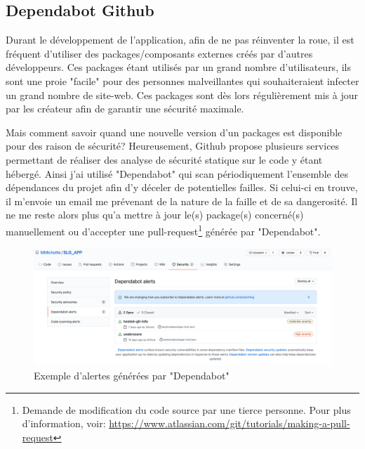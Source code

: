 \newpage 

\subsection{Dependabot Github}

Durant le développement de l'application, afin de ne pas réinventer la roue, il est fréquent d'utiliser des packages/composants externes créés par d'autres développeurs. Ces packages étant utilisés par un grand nombre d'utilisateurs, ils sont une proie "facile" pour des personnes malveillantes qui souhaiteraient infecter un grand nombre de site-web. Ces packages sont dès lors régulièrement mis à jour par les créateur afin de garantir une sécurité maximale. 

\newpara 

Mais comment savoir quand une nouvelle version d'un packages est disponible pour des raison de sécurité? Heureusement, Github propose plusieurs services permettant de réaliser des analyse de sécurité statique sur le code y étant hébergé. Ainsi j'ai utilisé "Dependabot" qui scan périodiquement l'ensemble des dépendances du projet afin d'y déceler de potentielles failles. Si celui-ci en trouve, il m'envoie un email me prévenant de la nature de la faille et de sa dangerosité. Il ne me reste alors plus qu'a mettre à jour le(s) package(s) concerné(s) manuellement ou d'accepter une pull-request\footnote{Demande de modification du code source par une tierce personne. Pour plus d'information, voir: \url{https://www.atlassian.com/git/tutorials/making-a-pull-request}} générée par "Dependabot".

\newpara

\begin{figure}[H]
  \centering
  \includegraphics[width=\linewidth]{img/dependabot.png}
  \caption{Exemple d'alertes générées par "Dependabot"}
\end{figure}